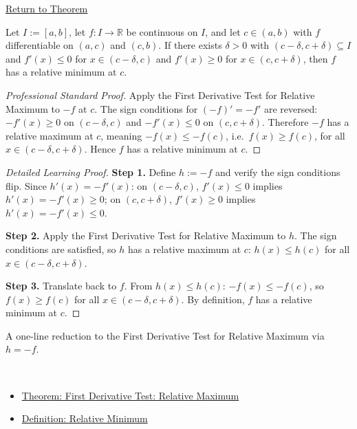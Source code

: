 \newpage
{}
\label{prf:first-derivative-test-minimum}

\begin{remark*}[Return]
\hyperref[thm:first-derivative-test-minimum]{Return to Theorem}
\end{remark*}

\begin{theorem*}
Let $I := [a,b]$, let $f : I \to \mathbb{R}$ be continuous on $I$, and let $c \in (a,b)$ with $f$ differentiable on $(a,c)$ and $(c,b)$. If there exists $\delta > 0$ with $(c-\delta,c+\delta) \subseteq I$ and $f'(x) \leq 0$ for $x \in (c-\delta,c)$ and $f'(x) \geq 0$ for $x \in (c,c+\delta)$, then $f$ has a relative minimum at $c$.
\end{theorem*}

\begin{proof}[Professional Standard Proof]
\LRAProofBodyStart
Apply the First Derivative Test for Relative Maximum to $-f$ at $c$. The sign conditions for $(-f)'= -f'$ are reversed: $-f'(x) \geq 0$ on $(c-\delta,c)$ and $-f'(x) \leq 0$ on $(c,c+\delta)$. Therefore $-f$ has a relative maximum at $c$, meaning $-f(x) \leq -f(c)$, i.e.\ $f(x) \geq f(c)$, for all $x \in (c-\delta,c+\delta)$. Hence $f$ has a relative minimum at $c$.
\end{proof}

\begin{proof}[Detailed Learning Proof]
\LRAProofBodyStart

\textbf{Step 1.} Define $h := -f$ and verify the sign conditions flip. Since $h'(x) = -f'(x)$: on $(c-\delta,c)$, $f'(x) \leq 0$ implies $h'(x) = -f'(x) \geq 0$; on $(c,c+\delta)$, $f'(x) \geq 0$ implies $h'(x) = -f'(x) \leq 0$.

\textbf{Step 2.} Apply the First Derivative Test for Relative Maximum to $h$. The sign conditions are satisfied, so $h$ has a relative maximum at $c$: $h(x) \leq h(c)$ for all $x \in (c-\delta,c+\delta)$.

\textbf{Step 3.} Translate back to $f$. From $h(x) \leq h(c)$: $-f(x) \leq -f(c)$, so $f(x) \geq f(c)$ for all $x \in (c-\delta,c+\delta)$. By definition, $f$ has a relative minimum at $c$.
\end{proof}

\begin{remark*}
A one-line reduction to the First Derivative Test for Relative Maximum via $h = -f$.
\end{remark*}

\begin{remark*}[Dependencies]~\\
\begin{itemize}
  \item \hyperref[thm:first-derivative-test-maximum]{Theorem: First Derivative Test: Relative Maximum}
  \item \hyperref[def:relative-minimum]{Definition: Relative Minimum}
\end{itemize}
\end{remark*}

\clearpage
